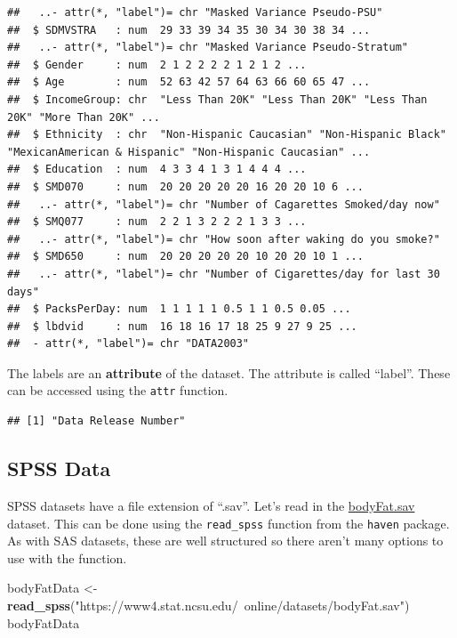 \documentclass[
]{book}
\newenvironment{Shaded}{\begin{snugshade}}{\end{snugshade}}
\newcommand{\KeywordTok}[1]{\textcolor[rgb]{0.13,0.29,0.53}{\textbf{#1}}}
\newcommand{\NormalTok}[1]{#1}
\newcommand{\OperatorTok}[1]{\textcolor[rgb]{0.81,0.36,0.00}{\textbf{#1}}}
\newcommand{\StringTok}[1]{\textcolor[rgb]{0.31,0.60,0.02}{#1}}
\theoremstyle{definition}
\theoremstyle{definition}
\theoremstyle{definition}
\theoremstyle{remark}
\begin{document}
\begin{verbatim}
##   ..- attr(*, "label")= chr "Masked Variance Pseudo-PSU"
##  $ SDMVSTRA   : num  29 33 39 34 35 30 34 30 38 34 ...
##   ..- attr(*, "label")= chr "Masked Variance Pseudo-Stratum"
##  $ Gender     : num  2 1 2 2 2 2 1 2 1 2 ...
##  $ Age        : num  52 63 42 57 64 63 66 60 65 47 ...
##  $ IncomeGroup: chr  "Less Than 20K" "Less Than 20K" "Less Than 20K" "More Than 20K" ...
##  $ Ethnicity  : chr  "Non-Hispanic Caucasian" "Non-Hispanic Black" "MexicanAmerican & Hispanic" "Non-Hispanic Caucasian" ...
##  $ Education  : num  4 3 3 4 1 3 1 4 4 4 ...
##  $ SMD070     : num  20 20 20 20 20 16 20 20 10 6 ...
##   ..- attr(*, "label")= chr "Number of Cagarettes Smoked/day now"
##  $ SMQ077     : num  2 2 1 3 2 2 2 1 3 3 ...
##   ..- attr(*, "label")= chr "How soon after waking do you smoke?"
##  $ SMD650     : num  20 20 20 20 20 10 20 20 10 1 ...
##   ..- attr(*, "label")= chr "Number of Cigarettes/day for last 30 days"
##  $ PacksPerDay: num  1 1 1 1 1 0.5 1 1 0.5 0.05 ...
##  $ lbdvid     : num  16 18 16 17 18 25 9 27 9 25 ...
##  - attr(*, "label")= chr "DATA2003"
\end{verbatim}

The labels are an \textbf{attribute} of the dataset. The attribute is called ``label''. These can be accessed using the \texttt{attr} function.

\begin{Shaded}
\end{Shaded}

\begin{verbatim}
## [1] "Data Release Number"
\end{verbatim}

\hypertarget{spss-data}{%
\subsection{SPSS Data}\label{spss-data}}

SPSS datasets have a file extension of ``.sav''. Let's read in the \href{https://www4.stat.ncsu.edu/~online/datasets/bodyFat.sav}{bodyFat.sav} dataset. This can be done using the \texttt{read\_spss} function from the \texttt{haven} package. As with SAS datasets, these are well structured so there aren't many options to use with the function.

\begin{Shaded}
\begin{Highlighting}[]
\NormalTok{bodyFatData <-}\StringTok{ }\KeywordTok{read_spss}\NormalTok{(}\StringTok{"https://www4.stat.ncsu.edu/~online/datasets/bodyFat.sav"}\NormalTok{)}
\NormalTok{bodyFatData}
\end{Highlighting}
\end{Shaded}
\end{document}
